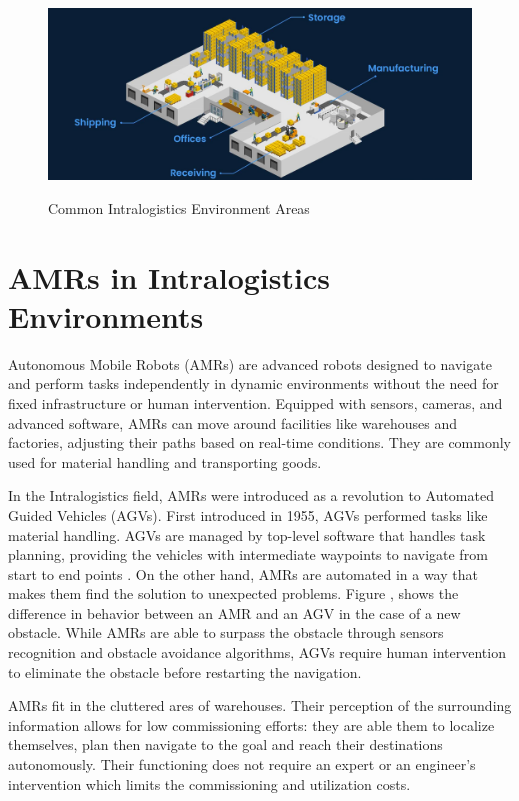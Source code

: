 \begin{figure}[H]
    \begin{center}
        \includegraphics[width=6in]{images/Chap1/common-warehouse-areas.jpg}\\
        \caption{Common Intralogistics Environment Areas \cite{R46}}
        \label{Areas}
        \end{center}
\end{figure}

\section{AMRs in Intralogistics Environments}
Autonomous Mobile Robots (AMRs) are advanced robots designed to navigate and perform tasks independently 
in dynamic environments without the need for fixed infrastructure or human intervention. Equipped with 
sensors, cameras, and advanced software, AMRs can move around facilities like warehouses and 
factories, adjusting their paths based on real-time conditions. They are commonly used 
for material handling and transporting goods.

In the Intralogistics field, AMRs were introduced as a revolution to Automated Guided Vehicles (AGVs). 
First introduced in 1955, AGVs performed tasks like 
material handling. AGVs are managed by top-level software that handles task planning, 
providing the vehicles with intermediate waypoints to navigate from start to end points \cite{R7}.
On the other hand, AMRs are automated in a way that makes them find the solution to unexpected problems. 
Figure , shows the difference in behavior between an AMR and an AGV in the case of a 
new obstacle. While AMRs are able to surpass the obstacle through sensors recognition and obstacle 
avoidance algorithms, AGVs require human intervention to eliminate the obstacle before restarting the navigation.

AMRs fit in the cluttered ares of warehouses. Their perception of the surrounding information allows for
low commissioning efforts: they are able them to localize themselves, plan then navigate to the goal and reach their 
destinations autonomously. Their functioning does not require an expert or an engineer's intervention which 
limits the commissioning and utilization costs.


